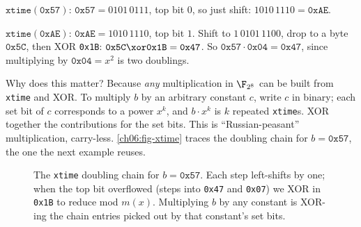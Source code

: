 \begin{example}
\label{ch06:ex-xtime}
$\texttt{xtime}(\texttt{0x57})$: $\texttt{0x57} = 0101\,0111$, top bit $0$,
so just shift: $1010\,1110 = \texttt{0xAE}$.

$\texttt{xtime}(\texttt{0xAE})$: $\texttt{0xAE} = 1010\,1110$, top bit $1$.
Shift to $1\,0101\,1100$, drop to a byte $\texttt{0x5C}$, then XOR
\texttt{0x1B}: $\texttt{0x5C} \xor \texttt{0x1B} = \texttt{0x47}$. So
$\texttt{0x57}\cdot \texttt{0x04} = \texttt{0x47}$, since multiplying by
$\texttt{0x04} = x^2$ is two doublings.
\end{example}

Why does this matter? Because \emph{any} multiplication in $\F_{2^8}$ can be
built from \texttt{xtime} and XOR. To multiply $b$ by an arbitrary constant
$c$, write $c$ in binary; each set bit of $c$ corresponds to a power $x^k$,
and $b \cdot x^k$ is $k$ repeated \texttt{xtime}s. XOR together the
contributions for the set bits. This is ``Russian-peasant'' multiplication,
carry-less. \autoref{ch06:fig-xtime} traces the doubling chain for
$b = \texttt{0x57}$, the one the next example reuses.

\begin{figure}[H]
\centering
{}
\caption{The \texttt{xtime} doubling chain for $b=\texttt{0x57}$. Each step
left-shifts by one; when the top bit overflowed (steps into \texttt{0x47} and
\texttt{0x07}) we XOR in \texttt{0x1B} to reduce mod $m(x)$. Multiplying $b$
by any constant is XOR-ing the chain entries picked out by that constant's
set bits.}
\label{ch06:fig-xtime}
\end{figure}

